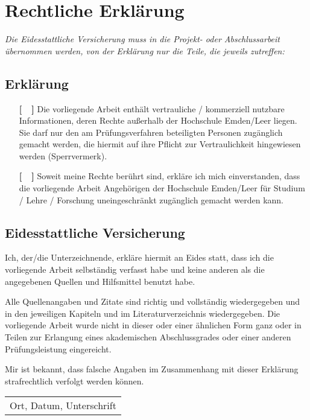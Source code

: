%
\chapter*{Rechtliche Erklärung}
\label{sec:Declaration} %
%
{\it Die Eidesstattliche Versicherung muss in die Projekt- oder Abschlussarbeit übernommen werden, von der Erklärung nur die Teile, die jeweils zutreffen:}
\section*{Erklärung}
\begin{itemize}
\item[ {\bf [~~]} ] Die vorliegende Arbeit enthält vertrauliche / kommerziell nutzbare Informationen, deren Rechte außerhalb der Hochschule Emden/Leer liegen.
Sie darf nur den am Prüfungsverfahren beteiligten Personen zugänglich gemacht werden, die hiermit auf ihre Pflicht zur Vertraulichkeit hingewiesen werden (Sperrvermerk).

\item[ {\bf [~~]} ] Soweit meine Rechte berührt sind, erkläre ich mich einverstanden, dass die vorliegende Arbeit Angehörigen der Hochschule Emden/Leer für Studium / Lehre / Forschung uneingeschränkt zugänglich gemacht werden kann.


\end{itemize}
%

\section*{Eidesstattliche Versicherung}

Ich, der/die Unterzeichnende, erkläre hiermit an Eides statt, dass ich die vorliegende Arbeit selbständig verfasst habe und keine anderen als die angegebenen Quellen und Hilfsmittel benutzt habe. 

Alle Quellenangaben und Zitate sind richtig und vollständig wiedergegeben und in den jeweiligen Kapiteln und im Literaturverzeichnis
wiedergegeben. Die vorliegende Arbeit wurde nicht in dieser oder einer ähnlichen Form ganz oder in Teilen zur Erlangung eines akademischen Abschlussgrades oder einer anderen Prüfungsleistung eingereicht.

Mir ist bekannt, dass falsche Angaben im Zusammenhang mit dieser Erklärung strafrechtlich verfolgt werden können.

\vspace{2.0cm}

\begin{tabular}{p{5.0cm}}
   \hline
   Ort, Datum, Unterschrift
\end{tabular}
